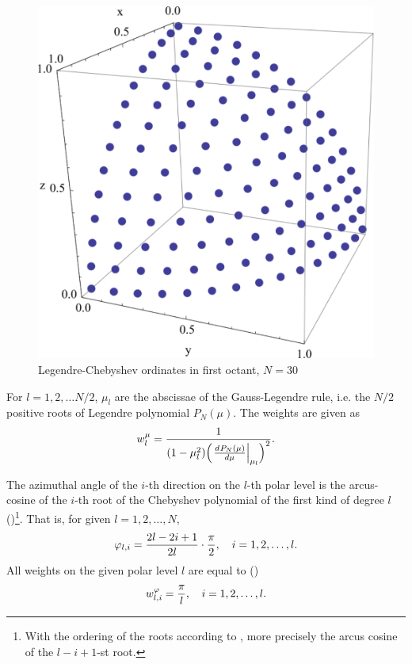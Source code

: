 \begin{figure}[!h]
  \centering
  \includegraphics[scale=.375]{ordinates}
  \caption[Discrete ordinates in the first octant]{Legendre-Chebyshev
  ordinates in first octant, $N=30$}
\end{figure}

For $l = 1,2,\ldots
N/2$, $\mu_l$ are the abscissae of the Gauss-Legendre rule, i.e. the $N/2$ positive roots of Legendre polynomial
$P_N(\mu)$. The weights are given as
$$
	w_{l}^\mu = \frac{1}{(1-\mu_l^2)\Bigl(\left.\frac{{d}^{}{P_N(\mu)}}{{d} {\mu}^{}}\right\vert_{\mu_l}\Bigr)^2}.
$$

The azimuthal angle of the $i$-th direction on the $l$-th polar level is the arcus-cosine of the
$i$-th root of the Chebyshev polynomial of the first kind of degree $l$ (\cite[p.402]{weissteinCRC})\footnote{With the
ordering of the roots according to \cite{weissteinCRC}, more precisely the arcus cosine of the $l-i+1$-st root.}. That
is, for given $l = 1,2,\ldots,N$, 
$$
	\varphi_{l,i} = \frac{2l-2i+1}{2l}\cdot\frac{\pi}{2},\quad i = 1,2,\ldots, l.
$$
All weights on the given polar level $l$ are equal to (\cite[p.402]{weissteinCRC})
$$
	w_{l,i}^\varphi = \frac{\pi}{l},\quad i = 1,2,\ldots, l.
$$


